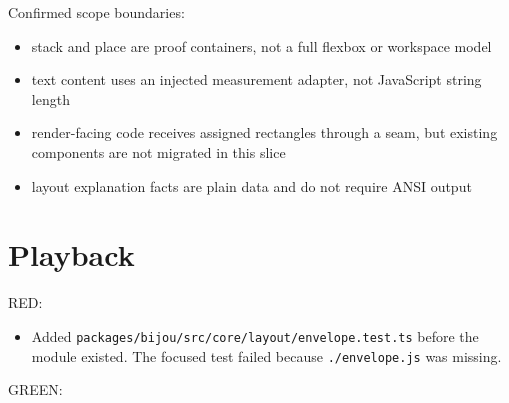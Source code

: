 Confirmed scope boundaries:

\begin{itemize}
\tightlist
\item
  stack and place are proof containers, not a full flexbox or workspace model
\item
  text content uses an injected measurement adapter, not JavaScript string length
\item
  render-facing code receives assigned rectangles through a seam, but existing components are not migrated in this slice
\item
  layout explanation facts are plain data and do not require ANSI output
\end{itemize}

\section{Playback}\label{record-163-playback}

RED:

\begin{itemize}
\tightlist
\item
  Added \texttt{p\allowbreak{}a\allowbreak{}c\allowbreak{}k\allowbreak{}a\allowbreak{}g\allowbreak{}e\allowbreak{}s\allowbreak{}/\allowbreak{}b\allowbreak{}i\allowbreak{}j\allowbreak{}o\allowbreak{}u\allowbreak{}/\allowbreak{}s\allowbreak{}r\allowbreak{}c\allowbreak{}/\allowbreak{}c\allowbreak{}o\allowbreak{}r\allowbreak{}e\allowbreak{}/\allowbreak{}l\allowbreak{}a\allowbreak{}y\allowbreak{}o\allowbreak{}u\allowbreak{}t\allowbreak{}/\allowbreak{}e\allowbreak{}n\allowbreak{}v\allowbreak{}e\allowbreak{}l\allowbreak{}o\allowbreak{}p\allowbreak{}e\allowbreak{}.\allowbreak{}t\allowbreak{}e\allowbreak{}s\allowbreak{}t\allowbreak{}.\allowbreak{}t\allowbreak{}s} before the module existed. The focused test failed because \texttt{.\allowbreak{}/\allowbreak{}e\allowbreak{}n\allowbreak{}v\allowbreak{}e\allowbreak{}l\allowbreak{}o\allowbreak{}p\allowbreak{}e\allowbreak{}.\allowbreak{}j\allowbreak{}s} was missing.
\end{itemize}

GREEN:

